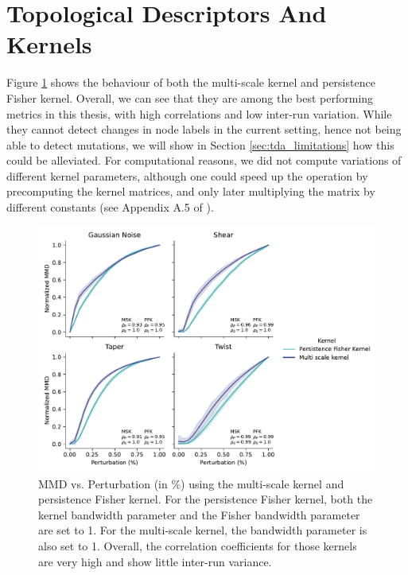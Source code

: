 \section{Topological Descriptors And Kernels}\label{sec:results_topo_kernels}

Figure \ref{fig:tda_kernels} shows the behaviour of both the multi-scale kernel
and persistence Fisher kernel. Overall, we can see that they are among the best
performing metrics in this thesis, with high correlations and low inter-run
variation. While they cannot detect changes in node labels in the current
setting, hence not being able to detect mutations, we will show in Section
\ref{sec:tda_limitations} how this could be alleviated. For computational
reasons, we did not compute variations of different kernel parameters, although
one could speed up the operation by precomputing the kernel matrices, and only
later multiplying the matrix by different constants (see Appendix A.5 of
\citep{o2021evaluation}).

\begin{figure}
  \centering
  \includegraphics[width=\textwidth]{./figures/results/res_6.pdf}
  \caption[MMD using topological kernels.]{MMD vs. Perturbation (in \%) using the multi-scale
kernel and persistence Fisher kernel. For the persistence Fisher kernel, both
the kernel bandwidth parameter and the Fisher bandwidth parameter are set to 1.
For the multi-scale kernel, the bandwidth parameter is also set to 1. Overall,
the correlation coefficients for those kernels are very high and show little
inter-run variance.}
  \label{fig:tda_kernels}
\end{figure}


